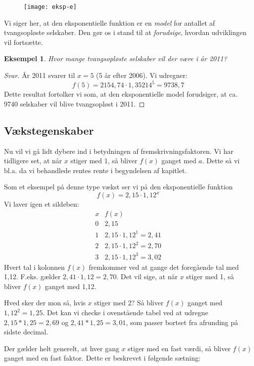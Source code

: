 \documentclass[12pt,oneside,a4paper]{article}
\newtheorem{eks}[thm]{Eksempel}
\begin{document}
\begin{figure}[ht]
    \centering
    \texttt{[image: eksp-e]}
    \label{eksp-e}
\end{figure}

Vi siger her, at den eksponentielle funktion er en {\em model} for antallet af
tvangsopløste selskaber. Den gør os i stand til at {\em forudsige}, hvordan
udviklingen vil fortsætte.

\begin{eks}
    Hvor mange tvangsopløste selskaber vil der være i år 2011?
\end{eks}
\begin{proof}[Svar]
    År 2011 svarer til $x=5$ (5 år efter 2006). Vi udregner:
    $$
    f(5) = 2154,74 \cdot 1,35214^5 = 9738,7
    $$
    Dette resultat fortolker vi som, at den eksponentielle
    model forudsiger, at ca. 9740 selskaber vil blive tvangsopløst i 2011.
\end{proof}
    

\subsection{Vækstegenskaber}
Nu vil vi gå lidt dybere ind i betydningen af fremskrivningsfaktoren. Vi har tidligere
set, at når $x$ stiger med 1, så bliver $f(x)$ ganget med $a$. Dette så vi bl.a. da
vi behandlede rentes rente i begyndelsen af kapitlet.

Som et eksempel på denne type vækst ser vi på den eksponentielle funktion
$$
f(x) = 2,15 \cdot 1,12^x
$$
Vi laver igen et sildeben:
$$
\begin{array}{r|l}
    x & f(x) \\
    0 & 2,15 \\
    1 & 2,15 \cdot 1,12^1 = 2,41 \\
    2 & 2,15 \cdot 1,12^2 = 2,70 \\
    3 & 2,15 \cdot 1,12^3 = 3,02
\end{array}
$$
Hvert tal i kolonnen $f(x)$ fremkommer ved at gange det foregående tal med
1,12. F.eks. gælder $2,41 \cdot 1,12 = 2,70$. Det vil sige, at når $x$ stiger
med 1, så bliver $f(x)$ ganget med 1,12.

Hved sker der mon så, hvis $x$ stiger med 2? Så bliver $f(x)$ ganget med
$1,12^2 = 1,25$.  Det kan vi checke i ovenstående tabel ved at udregne
$2,15*1,25 = 2,69$ og $2,41*1,25 = 3,01$, som passer bortset fra afrunding på
sidste decimal.

Der gælder helt generelt, at hver gang $x$ stiger med en fast værdi, så bliver
$f(x)$ ganget med en fast faktor. Dette er beskrevet i følgende sætning:
\end{document}
